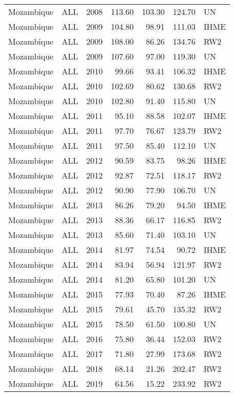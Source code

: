 \begin{longtable}{lllrrrl}
  Mozambique & ALL & 2008 & 113.60 & 103.30 & 124.70 & UN \\ 
  Mozambique & ALL & 2009 & 104.80 & 98.91 & 111.03 & IHME \\ 
  Mozambique & ALL & 2009 & 108.00 & 86.26 & 134.76 & RW2 \\ 
  Mozambique & ALL & 2009 & 107.60 & 97.00 & 119.30 & UN \\ 
  Mozambique & ALL & 2010 & 99.66 & 93.41 & 106.32 & IHME \\ 
  Mozambique & ALL & 2010 & 102.69 & 80.62 & 130.68 & RW2 \\ 
  Mozambique & ALL & 2010 & 102.80 & 91.40 & 115.80 & UN \\ 
  Mozambique & ALL & 2011 & 95.10 & 88.58 & 102.07 & IHME \\ 
  Mozambique & ALL & 2011 & 97.70 & 76.67 & 123.79 & RW2 \\ 
  Mozambique & ALL & 2011 & 97.50 & 85.40 & 112.10 & UN \\ 
  Mozambique & ALL & 2012 & 90.59 & 83.75 & 98.26 & IHME \\ 
  Mozambique & ALL & 2012 & 92.87 & 72.51 & 118.17 & RW2 \\ 
  Mozambique & ALL & 2012 & 90.90 & 77.90 & 106.70 & UN \\ 
  Mozambique & ALL & 2013 & 86.26 & 79.20 & 94.50 & IHME \\ 
  Mozambique & ALL & 2013 & 88.36 & 66.17 & 116.85 & RW2 \\ 
  Mozambique & ALL & 2013 & 85.60 & 71.40 & 103.10 & UN \\ 
  Mozambique & ALL & 2014 & 81.97 & 74.54 & 90.72 & IHME \\ 
  Mozambique & ALL & 2014 & 83.94 & 56.94 & 121.97 & RW2 \\ 
  Mozambique & ALL & 2014 & 81.20 & 65.80 & 101.20 & UN \\ 
  Mozambique & ALL & 2015 & 77.93 & 70.40 & 87.26 & IHME \\ 
  Mozambique & ALL & 2015 & 79.61 & 45.70 & 135.32 & RW2 \\ 
  Mozambique & ALL & 2015 & 78.50 & 61.50 & 100.80 & UN \\ 
  Mozambique & ALL & 2016 & 75.80 & 36.44 & 152.03 & RW2 \\ 
  Mozambique & ALL & 2017 & 71.80 & 27.99 & 173.68 & RW2 \\ 
  Mozambique & ALL & 2018 & 68.14 & 21.26 & 202.47 & RW2 \\ 
  Mozambique & ALL & 2019 & 64.56 & 15.22 & 233.92 & RW2 \\ 

\end{longtable}
